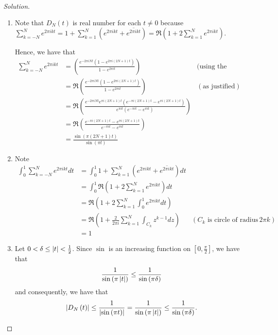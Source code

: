 \begin{proof}[Solution]
\begin{enumerate}
\item Note that $D_{N} (t)$ is real number for each $t \ne 0$ because 
$\sum_{k=-N}^{N} e^{2\pi i k t}  = 1 + \sum_{k=1}^{N}\left( e^{2\pi i k t} + \overline{e^{2 \pi i k t}} \right) = \Re \left( 1+ 2 \sum_{k=1}^{N} e^{2\pi i k t} \right)$.

Hence, we have that
\begin{align*}
\sum_{k=-N}^{N} e^{2\pi i k t} &= \left( \frac{e^{-2\pi iN t} \left( 1 - e^{2\pi i \left( 2N+1 \right) t} \right)}{1- e^{2\pi i t}} \right) & \text{(using the geometric formula)} \\
&= \Re  \left( \frac{e^{-2\pi iN t} \left( 1 - e^{2\pi i \left( 2N+1 \right) t} \right)}{1- e^{2\pi i t}} \right) & \left(\text{as justified} \right)\\
&= \Re \left(  \frac{e^{-2\pi iN t} e^{\pi i \left( 2N+1 \right)t} \left( e^{-\pi i \left( 2N+1 \right)t} - e^{\pi i \left( 2N+1 \right) t} \right)}{e^{\pi i t}(e^{-\pi i t}- e^{\pi i t})}  \right) \\
&= \Re \left( \frac{ e^{-\pi i \left( 2N+1 \right)t} - e^{\pi i \left( 2N+1 \right) t} }{e^{-\pi i t} - e^{\pi i t}} \right) \\
&= \frac{\sin \left( \pi \left( 2N+1 \right)t \right)}{\sin \left( \pi t \right)}
\end{align*}

\item Note \begin{align*}
\int_{0}^{1}\sum_{k=-N}^{N} e^{2\pi i k t}  dt 
&= \int_{0}^{1} 1 + \sum_{k=1}^{N}\left( e^{2\pi i k t} + \overline{e^{2 \pi i k t}} \right) dt \\
&= \int_{0}^{1} \Re \left( 1+ 2 \sum_{k=1}^{N} e^{2\pi i k t} \right) dt \\
&=  \Re \left( 1+ 2 \sum_{k=1}^{N} \int_{0}^{1} e^{2\pi i k t} dt \right)  \\
&=  \Re \left( 1+ \frac{2}{2\pi i} \sum_{k=1}^{N} \int_{C_{k}} z^{k-1} dz \right)  & \left( C_{k} \text{ is circle of radius }2\pi k \right) \\
&= 1
\end{align*}
\item Let $0 < \delta \le \left\lvert t \right\rvert < \frac{1}{2}$. Since $\sin$ is an increasing function on $[0, \frac{\pi}{2}]$, we have that 
\begin{equation*}
\frac{1}{\sin \left( \pi\left\lvert t \right\rvert\right) } \le \frac{1}{\sin \left( \pi \delta \right)}
\end{equation*}
and consequently, we have that 
\begin{align*}
\left\lvert D_{N} \left( t \right) \right\rvert \le \frac{1}{\left\lvert \sin \left( \pi t \right) \right\rvert} = \frac{1}{\sin \left( \pi \left\lvert t \right\rvert \right)} \le \frac{1}{\sin \left( \pi \delta \right)}.
\end{align*}
\end{enumerate}
\end{proof}
